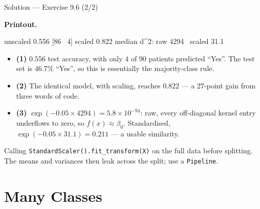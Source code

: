\documentclass[aspectratio=169,11pt]{beamer}
\begin{document}
\begin{frame}{Solution --- Exercise 9.6 (2/2)}
\begin{solutionbox}
  \scriptsize
  \textbf{Printout.}
  \begin{center}\ttfamily\scriptsize
  unscaled 0.556 [86 \ 4] \quad scaled 0.822 \quad median d\^{}2: raw 4294 \ scaled 31.1
  \end{center}
  \begin{itemize}
    \item \textbf{(1)} $0.556$ test accuracy, with only $4$ of $90$ patients
          predicted ``Yes''. The test set is $46.7\%$ ``Yes'', so this is
          essentially the majority-class rule.
    \item \textbf{(2)} The identical model, with scaling, reaches
          $\mathbf{0.822}$ --- a $27$-point gain from three words of code.
    \item \textbf{(3)} $\exp(-0.05\times4294) = 5.8\times10^{-94}$: raw, every
          off-diagonal kernel entry underflows to zero, so $f(x)\approx\beta_0$.
          Standardised, $\exp(-0.05\times31.1)=0.211$ --- a usable similarity.
  \end{itemize}
\end{solutionbox}
\begin{mistake}
  Calling \texttt{StandardScaler().fit\_transform(X)} on the full data before
  splitting. The means and variances then leak across the split; use a
  \texttt{Pipeline}.
\end{mistake}
\end{frame}

\section{Many Classes}
\end{document}
